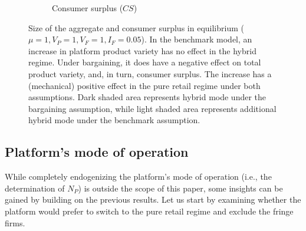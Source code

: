 \begin{figure}
\begin{subfigure}[b]{0.45\textwidth}
        \caption{Consumer surplus ($CS$)}
        \label{fig:welfare_consumer_surplus}
    \end{subfigure}
    \caption{Size of the aggregate and consumer surplus in equilibrium ($\mu = 1, V_P = 1, V_F = 1, I_F = 0.05$). In the benchmark model, an increase in platform product variety has no effect in the hybrid regime. Under bargaining, it does have a negative effect on total product variety, and, in turn, consumer surplus. The increase has a (mechanical) positive effect in the pure retail regime under both assumptions. Dark shaded area represents hybrid mode under the bargaining assumption, while light shaded area represents additional hybrid mode under the benchmark assumption.}
    \label{fig:welfare}
\end{figure}


\subsection{Platform's mode of operation}
\label{sec:endogenizing_n_p}

While completely endogenizing the platform's mode of operation (i.e., the determination of $N_P$) is outside the scope of this paper, some insights can be gained by building on the previous results.
Let us start by examining whether the platform would prefer to switch to the pure retail regime and exclude the fringe firms.

